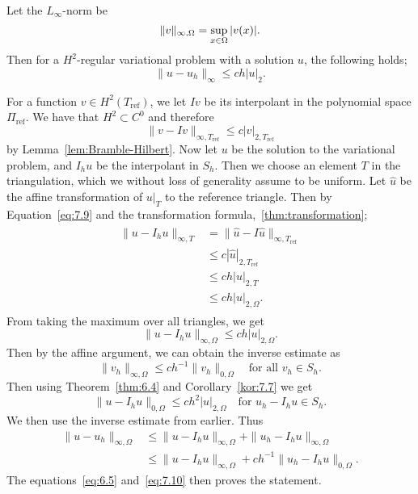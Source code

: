 \begin{thmx}{\quad\label{thm:max_error}}
    Let the $L_\infty$-norm be 
    \begin{equation*}
        \|v\|_{\infty, \Omega} = \sup_{x\in\Omega} |v(x)|.
    \end{equation*}
    Then 
    for a $H^2$-regular variational problem with a solution $u$, the following holds;
    \begin{equation}
        \|u-u_h\|_{\infty}\leq ch|u|_2.
    \end{equation}
\end{thmx}
\begin{bev}
    For a function $v\in H^2(T_{\text{ref}})$, we let $Iv$ be its interpolant in the polynomial space $\Pi_{\text{ref}}$.
    We have that $H^2\subset C^0$ and therefore 
    \begin{equation}
        \|v-Iv\|_{\infty,T_\text{ref}} \leq c|v|_{2,T_\text{ref}}
        \label{eq:7.9}
    \end{equation}
    by Lemma~\ref{lem:Bramble-Hilbert}.
    Now let $u$ be the solution to the variational problem, and $I_h u$ be the interpolant in $S_h$.
    Then we choose an element $T$ in the triangulation, which we without loss of generality assume to be uniform. 
    Let $\hat{u}$ be the affine transformation of $u|_T$ to the reference triangle.
    Then by Equation~\ref{eq:7.9} and the transformation formula,~\ref{thm:transformation};
    \begin{align}
        \begin{split}
            \|u-I_h u\|_{\infty,T} &= \|\hat{u} - I\hat{u}\|_{\infty,T_{\text{ref}}} \\
            &\leq c|\hat{u}|_{2,T_{\text{ref}}} \\
            &\leq ch|u|_{2,T} \\
            &\leq ch|u|_{2,\Omega}.
        \end{split}
        \label{eq:7.10}
    \end{align}
    From taking the maximum over all triangles, we get
    \begin{equation}
        \|u - I_h u \|_{\infty,\Omega} \leq ch|u|_{2,\Omega}.
    \end{equation}
    Then by the affine argument, we can obtain the inverse estimate as
    \begin{equation}
        \|v_h\|_{\infty,\Omega} \leq ch^{-1} \|v_h\|_{0,\Omega} \quad \text{for all } v_h\in S_h.
    \end{equation}
    Then using Theorem~\ref{thm:6.4} and Corollary~\ref{kor:7.7}
    we get
    \begin{equation}
        \|u-I_h u\|_{0,\Omega} \leq ch^2|u|_{2,\Omega}\quad \text{for } u_h-I_h u\in S_h.
    \end{equation}
    We then use the inverse estimate from earlier. Thus 
    \begin{align}
        \|u-u_h\|_{\infty,\Omega} &\leq \|u-I_h u\|_{\infty,\Omega} + \|u_h-I_h u\|_{\infty,\Omega} \\
        &\leq \|u-I_h u\|_{\infty,\Omega} + ch^{-1} \|u_h-I_h u\|_{0,\Omega}.
    \end{align}
    The equations~\eqref{eq:6.5} and~\eqref{eq:7.10} then proves the statement.
\end{bev}
